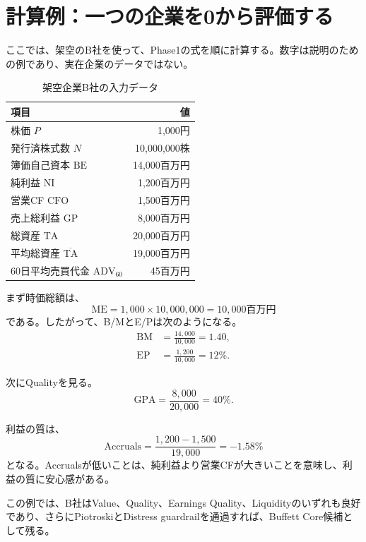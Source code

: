 \documentclass[11pt,a4paper]{article}
\newcommand{\BE}{\mathrm{BE}}
\newcommand{\ME}{\mathrm{ME}}
\newcommand{\NI}{\mathrm{NI}}
\newcommand{\TA}{\mathrm{TA}}
\newcommand{\GP}{\mathrm{GP}}
\newcommand{\CFO}{\mathrm{CFO}}
\newcommand{\ADV}{\mathrm{ADV}}
\begin{document}
\clearpage
\section{計算例：一つの企業を0から評価する}

ここでは、架空のB社を使って、Phase1の式を順に計算する。数字は説明のための例であり、実在企業のデータではない。

\begin{table}[tbp]
\caption{架空企業B社の入力データ}
\label{tab:worked-input}
\centering
\small
\begin{tabular}{lr}
\toprule
項目 & 値 \\
\midrule
株価 $P$ & 1,000円 \\
発行済株式数 $N$ & 10,000,000株 \\
簿価自己資本 $\BE$ & 14,000百万円 \\
純利益 $\NI$ & 1,200百万円 \\
営業CF $\CFO$ & 1,500百万円 \\
売上総利益 $\GP$ & 8,000百万円 \\
総資産 $\TA$ & 20,000百万円 \\
平均総資産 $\overline{\TA}$ & 19,000百万円 \\
60日平均売買代金 $\ADV_{60}$ & 45百万円 \\
\bottomrule
\end{tabular}
\end{table}

まず時価総額は、
\begin{equation}
\ME = 1{,}000\times 10{,}000{,}000 = 10{,}000\text{百万円}
\end{equation}
である。したがって、B/MとE/Pは次のようになる。
\begin{align}
\mathrm{BM} &= \frac{14{,}000}{10{,}000}=1.40,\\
\mathrm{EP} &= \frac{1{,}200}{10{,}000}=12\%.
\end{align}

次にQualityを見る。
\begin{equation}
\mathrm{GPA} = \frac{8{,}000}{20{,}000}=40\%.
\end{equation}

利益の質は、
\begin{equation}
\mathrm{Accruals} = \frac{1{,}200-1{,}500}{19{,}000}=-1.58\%
\end{equation}
となる。Accrualsが低いことは、純利益より営業CFが大きいことを意味し、利益の質に安心感がある。

この例では、B社はValue、Quality、Earnings Quality、Liquidityのいずれも良好であり、さらにPiotroskiとDistress guardrailを通過すれば、Buffett Core候補として残る。
\end{document}
